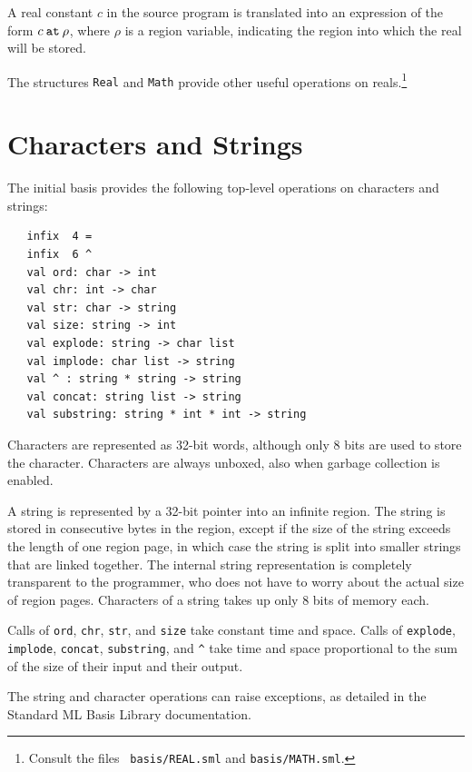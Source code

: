 \documentclass[12pt]{book}
\begin{document}
A real constant $c$ in the source program is translated into an
expression of the form 
%
$c\mathbin{\hbox{\tt at}}\rho$, where $\rho$ is a region variable, indicating the region
into which the real will be stored.

The structures {\tt Real} and {\tt Math} provide other useful
operations on reals.\footnote{Consult the files {\tt
    basis/REAL.sml} and {\tt basis/MATH.sml}.}

\section{Characters and Strings}
The 
%
initial basis provides the following top-level operations on characters and strings:
%
%
%
%
%
%
%
%
%
%
\begin{verbatim}
   infix  4 = 
   infix  6 ^
   val ord: char -> int
   val chr: int -> char
   val str: char -> string
   val size: string -> int
   val explode: string -> char list
   val implode: char list -> string
   val ^ : string * string -> string
   val concat: string list -> string
   val substring: string * int * int -> string
\end{verbatim}
Characters are represented as 32-bit words, although only 8 bits are
used to store the character. Characters are always unboxed, also when
garbage collection is enabled.

A string is represented by a 32-bit pointer into an infinite region.
The string is stored in consecutive bytes in the region, except if the
size of the string exceeds the length of one region page, in which
case the string is split into smaller strings that are linked
together. The internal string representation is completely transparent
to the programmer, who does not have to worry about the actual size of
region pages. Characters of a string takes up only 8 bits of
memory each.

Calls of {\tt ord}, {\tt chr}, {\tt str}, and {\tt size} take constant
time and space.  Calls of {\tt explode}, {\tt implode}, {\tt concat},
{\tt substring}, and \verb+^+ take time and space proportional to the
sum of the size of their input and their output.

The string and character operations can raise exceptions, as detailed in the
Standard ML Basis Library documentation.
\end{document}
